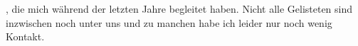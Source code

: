 
, die mich während der letzten Jahre begleitet haben. Nicht alle Gelisteten sind inzwischen noch unter uns und zu manchen habe ich leider nur noch wenig Kontakt.

